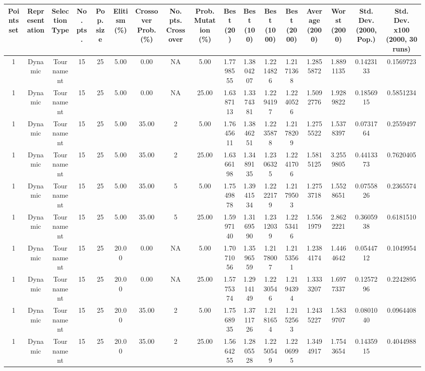 \begin{longtable}{ | c | c | c | c | c | c | c | c | c | c | c | c | c | c | c | c | c | }
	\hline
	\textbf{Points set}	&	\textbf{Representation}	&	\textbf{Selection Type}	&	\textbf{No. pts.}	&	\textbf{Pop. size}	&	\textbf{Elitism  (\%)}	&	\textbf{Crossover Prob. (\%)}	&	\textbf{No. pts. Crossover}	&	\textbf{Prob. Mutation (\%)}	&	\textbf{Best (20)}	&	\textbf{Best (100)}	&	\textbf{Best (1000)}	&	\textbf{Best (2000)}	&	\textbf{Average (2000)}	&	\textbf{Worst (2000)}	&	\textbf{Std. Dev. (2000, Pop.)}	&	\textbf{Std. Dev. x100 (2000, 30 runs)} \\
	\hline
	\hline
	1	&	Dynamic	&	Tournament	&	15	&	25	&	5.00	&	0.00	&	NA	&	5.00	&	1.7798555	&	1.3804207	&	1.2214826	&	1.2171368	&	1.2855872	&	1.8891135	&	0.1423133	&	0.1569723 \\
	\hline
	1	&	Dynamic	&	Tournament	&	15	&	25	&	5.00	&	0.00	&	NA	&	25.00	&	1.6387113	&	1.3374381	&	1.2294197	&	1.2240526	&	1.5092776	&	1.9289822	&	0.1856915	&	0.5851234 \\
	\hline
	1	&	Dynamic	&	Tournament	&	15	&	25	&	5.00	&	35.00	&	2	&	5.00	&	1.7645611	&	1.3846251	&	1.2235878	&	1.2178209	&	1.2755522	&	1.5378397	&	0.0731764	&	0.2559497 \\
	\hline
	1	&	Dynamic	&	Tournament	&	15	&	25	&	5.00	&	35.00	&	2	&	25.00	&	1.6366198	&	1.3489135	&	1.2306325	&	1.2241706	&	1.5815125	&	3.2559805	&	0.4413373	&	0.7620405 \\
	\hline
	1	&	Dynamic	&	Tournament	&	15	&	25	&	5.00	&	35.00	&	5	&	5.00	&	1.7549878	&	1.3941534	&	1.2222179	&	1.2179503	&	1.2753718	&	1.5528651	&	0.0755826	&	0.2365574 \\
	\hline
	1	&	Dynamic	&	Tournament	&	15	&	25	&	5.00	&	35.00	&	5	&	25.00	&	1.5997140	&	1.3169590	&	1.2312039	&	1.2253416	&	1.5561979	&	2.8622221	&	0.3605938	&	0.6181510 \\
	\hline
	1	&	Dynamic	&	Tournament	&	15	&	25	&	20.00	&	0.00	&	NA	&	5.00	&	1.7071056	&	1.3596559	&	1.2178007	&	1.2153561	&	1.2384174	&	1.4464642	&	0.0544712	&	0.1049954 \\
	\hline
	1	&	Dynamic	&	Tournament	&	15	&	25	&	20.00	&	0.00	&	NA	&	25.00	&	1.5775374	&	1.2914149	&	1.2230546	&	1.2194394	&	1.3333207	&	1.6977337	&	0.1257296	&	0.2242895 \\
	\hline
	1	&	Dynamic	&	Tournament	&	15	&	25	&	20.00	&	35.00	&	2	&	5.00	&	1.7568935	&	1.3711726	&	1.2181654	&	1.2152563	&	1.2435227	&	1.5839707	&	0.0801040	&	0.0964408 \\
	\hline
	1	&	Dynamic	&	Tournament	&	15	&	25	&	20.00	&	35.00	&	2	&	25.00	&	1.5664255	&	1.2805528	&	1.2250549	&	1.2206995	&	1.3494917	&	1.7543654	&	0.1435915	&	0.4044988 \\

\end{longtable}
